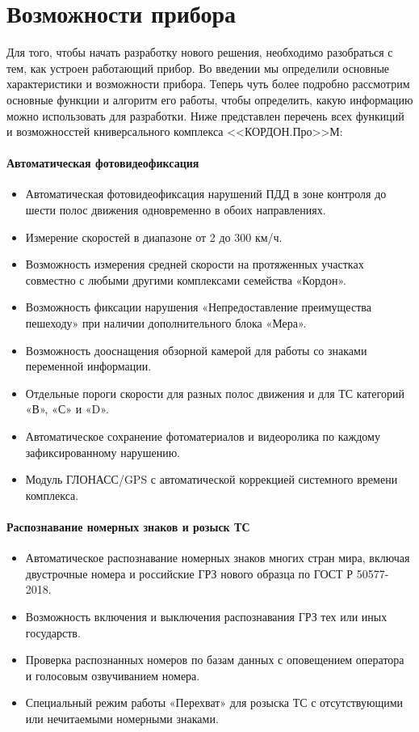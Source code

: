 \documentclass[specification,annotation,times]{itmo-student-thesis}
\begin{document}
\section{Возможности прибора} \label{sec:cordon-charact}
Для того, чтобы начать разработку нового решения, необходимо разобраться с тем, как устроен работающий прибор. Во введении мы определили основные характеристики и возможности прибора. Теперь чуть более подробно рассмотрим основные функции и алгоритм его работы, чтобы определить, какую информацию можно использовать для разработки. Ниже представлен перечень всех функиций и возможносстей книверсального комплекса <<КОРДОН.Про>>М:

\paragraph{Автоматическая фотовидеофиксация}
\begin{itemize}
	\item Автоматическая фотовидеофиксация нарушений ПДД в зоне контроля до шести полос движения  одновременно в обоих направлениях.
	\item Измерение скоростей в диапазоне от 2 до 300 км/ч.
	\item Возможность измерения средней скорости на протяженных участках совместно с любыми другими комплексами семейства «Кордон».
	\item Возможность фиксации нарушения «Непредоставление преимущества пешеходу» при наличии дополнительного блока «Мера».
	\item Возможность дооснащения обзорной камерой для работы со знаками переменной информации.
	\item Отдельные пороги скорости для разных полос движения и для ТС категорий «В», «С» и «D».
	\item Автоматическое сохранение фотоматериалов и видеоролика по каждому зафиксированному нарушению.
	\item Модуль ГЛОНАСС/GPS с автоматической коррекцией системного времени комплекса.
\end{itemize}

\paragraph{Распознавание номерных знаков и розыск ТС}
\begin{itemize}
	\item Автоматическое распознавание номерных знаков многих стран мира, включая двустрочные номера и российские ГРЗ нового образца по ГОСТ Р 50577-2018.
	\item Возможность включения и выключения распознавания ГРЗ тех или иных государств.
	\item Проверка распознанных номеров по базам данных с оповещением оператора и голосовым озвучиванием номера.
	\item Специальный режим работы «Перехват» для розыска ТС с отсутствующими или нечитаемыми номерными знаками.
\end{itemize}
\end{document}
